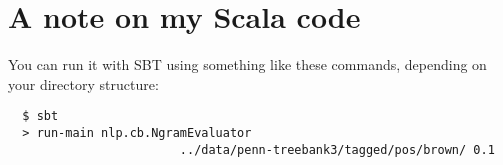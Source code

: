 \documentclass[10pt]{article}
\begin{document}
\section{A note on my Scala code}

You can run it with SBT using something like these commands, depending on your directory structure:

\begin{lstlisting}
  $ sbt
  > run-main nlp.cb.NgramEvaluator
                        ../data/penn-treebank3/tagged/pos/brown/ 0.1
\end{lstlisting}


% 
\end{document}
